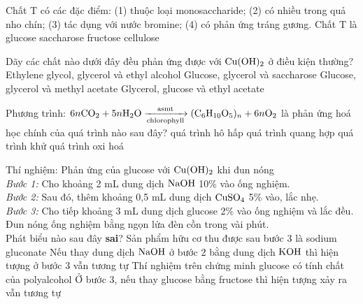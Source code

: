 \documentclass[12pt,a4paper]{article}
\begin{document}
\begin{ex}
Chất T có các đặc điểm: (1) thuộc loại monosaccharide; (2) có nhiều trong quả nho chín; (3) tác dụng với nước bromine; (4) có phản ứng tráng gương. Chất T là
\choice
{\True glucose}
{saccharose}
{fructose}
{cellulose}
\end{ex}

\begin{ex}
Dãy các chất nào dưới đây đều phản ứng được với $\ce{Cu(OH)2}$ ở điều kiện thường?
\choice
{Ethylene glycol, glycerol và ethyl alcohol}
{\True Glucose, glycerol và saccharose}
{Glucose, glycerol và methyl acetate}
{Glycerol, glucose và ethyl acetate}
\end{ex}

\begin{ex}
Phương trình: $6n\ce{CO2} + 5n\ce{H2O} \xrightarrow[\text{chlorophyll}]{\text{asmt}} (\ce{C6H10O5})_n + 6n\ce{O2}$ là phản ứng hoá học chính của quá trình nào sau đây?
\choice
{quá trình hô hấp}
{\True quá trình quang hợp}
{quá trình khử}
{quá trình oxi hoá}
\end{ex}

\begin{ex}
Thí nghiệm: Phản ứng của glucose với $\ce{Cu(OH)2}$ khi đun nóng\\
\textit{Bước 1:} Cho khoảng 2 mL dung dịch $\ce{NaOH}$ 10\% vào ống nghiệm.\\
\textit{Bước 2:} Sau đó, thêm khoảng 0,5 mL dung dịch $\ce{CuSO4}$ 5\% vào, lắc nhẹ.\\
\textit{Bước 3:} Cho tiếp khoảng 3 mL dung dịch glucose 2\% vào ống nghiệm và lắc đều. Đun nóng ống nghiệm bằng ngọn lửa đèn cồn trong vài phút.\\
Phát biểu nào sau đây \textbf{sai}?
\choice
{Sản phẩm hữu cơ thu được sau bước 3 là sodium gluconate}
{Nếu thay dung dịch $\ce{NaOH}$ ở bước 2 bằng dung dịch $\ce{KOH}$ thì hiện tượng ở bước 3 vẫn tương tự}
{\True Thí nghiệm trên chứng minh glucose có tính chất của polyalcohol}
{Ở bước 3, nếu thay glucose bằng fructose thì hiện tượng xảy ra vẫn tương tự}
\end{ex}
\end{document}
